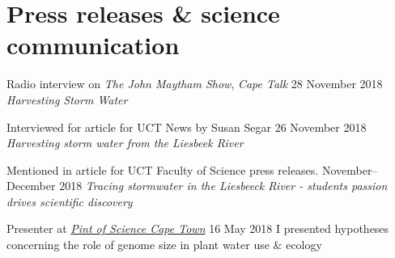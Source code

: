\documentclass[10pt]{article}
\begin{document}
\section*{Press releases \& science communication} %

\begin{hangparas}{2em}{1}


Radio interview on \textit{The John Maytham Show}, \textit{Cape Talk}
                                                  \hfill 28 November 2018 \break
\textit{Harvesting Storm Water}

Interviewed for article for UCT News by Susan Segar
                                                  \hfill 26 November 2018 \break
\textit{Harvesting storm water from the Liesbeek River}

Mentioned in article for UCT Faculty of Science press releases.
                                           \hfill November--December 2018 \break
\textit{Tracing stormwater in the Liesbeeck River - students passion drives
scientific discovery}

Presenter at \href{http://pintofsciencesa.wixsite.com/pintofsciencesa/uct-planet-earth-16}
{\textit{Pint of Science Cape Town}}                   \hfill 16 May 2018 \break
I presented hypotheses concerning the role of genome size in plant water use 
\& ecology

\hfill

\end{hangparas}
\end{document}
